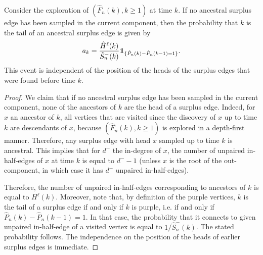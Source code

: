 \begin{lemma}\label{lemma.probancestral}
Consider the exploration of $(\hat{F}_n(k),k\geq 1)$ at time $k$. If no ancestral surplus edge has been sampled in the current component, then the probability that $k$ is the tail of an ancestral surplus edge is given by 
$$a_k=\frac{\hat{H}^\ell(k)}{\hat{S}_n^-(k)}\one_{\{\hat{P}_n(k)-\hat{P}_n(k-1)=1\}}.$$
This event is independent of the position of the heads of the surplus edges that were found before time $k$.
\end{lemma}
\begin{proof}
We claim that if no ancestral surplus edge has been sampled in the current component, none of the ancestors of $k$ are the head of a surplus edge. Indeed, for $x$ an ancestor of $k$, all vertices that are visited since the discovery of $x$ up to time $k$ are descendants of $x$, because $(\hat{F}_n(k),k\geq 1)$ is explored in a depth-first manner. Therefore, any surplus edge with head $x$ sampled up to time $k$ is ancestral. This implies that for $d^-$ the in-degree of $x$, the number of unpaired in-half-edges of $x$ at time $k$ is equal to $d^--1$ (unless $x$ is the root of the out-component, in which case it has $d^-$ unpaired in-half-edges).

Therefore, the number of unpaired in-half-edges corresponding to ancestors of $k$ is equal to $H^\ell(k)$. Moreover, note that, by definition of the purple vertices, $k$ is the tail of a surplus edge if and only if $k$ is purple, i.e. if and only if $\hat{P}_n(k)-\hat{P}_n(k-1)=1$. In that case, the probability that it connects to given unpaired in-half-edge of a visited vertex is equal to $1/\hat{S}_n^-(k)$. The stated probability follows. The independence on the position of the heads of earlier surplus edges is immediate.
\end{proof}

